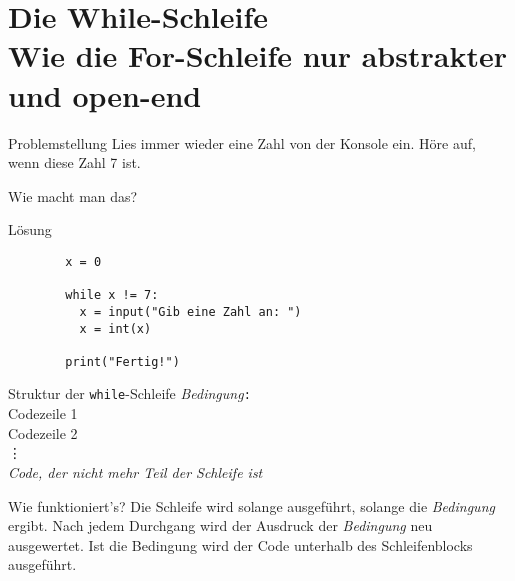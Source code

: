\section{Die While-Schleife \\ \footnotesize Wie die For-Schleife nur abstrakter und open-end}

\begin{frame}
\begin{block}{Problemstellung}
	\vspace{2pt}
	Lies immer wieder eine Zahl von der Konsole ein. Höre auf, wenn diese Zahl 7 ist. 
	
	Wie macht man das? 
\end{block}
\end{frame}

\begin{fragile}
	
\begin{block}{Lösung}
		\vspace{2pt}
		
	\begin{verbatim}
		x = 0
		
		while x != 7: 
		  x = input("Gib eine Zahl an: ")
		  x = int(x)
		  
		print("Fertig!")
	\end{verbatim}
	
\end{block}
\end{fragile}

\begin{frame}

\renewcommand{\baselinestretch}{1.5}
\begin{block}{Struktur der \texttt{while}-Schleife}
	\vspace{2pt}
	\pause {} \pause \textit{Bedingung}\pause\texttt{:} \pause \\
	\spacechar\spacechar Codezeile 1 \pause \\ 
	\spacechar\spacechar Codezeile 2 \pause \\
	\spacechar\spacechar \phantom{Code} \vdots \pause  \\
	\textit{Code, der nicht mehr Teil der Schleife ist}
\end{block}
\vspace{12pt}
\pause 
{}
\renewcommand{\baselinestretch}{1}
\begin{block}{Wie funktioniert's?}
	\vspace{2pt}
	Die Schleife wird solange ausgeführt, solange die \emph{Bedingung}  ergibt. Nach jedem Durchgang wird der Ausdruck der \emph{Bedingung} neu ausgewertet. 
	Ist die Bedingung  wird der Code unterhalb des Schleifenblocks ausgeführt. 
\end{block}

\end{frame}

